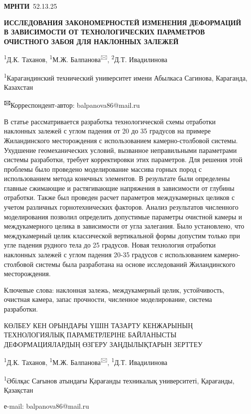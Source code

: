 \newpage
{\bfseries МРНТИ}~52.13.25

{\bfseries ИССЛЕДОВАНИЯ ЗАКОНОМЕРНОСТЕЙ ИЗМЕНЕНИЯ ДЕФОРМАЦИЙ В ЗАВИСИМОСТИ
ОТ ТЕХНОЛОГИЧЕСКИХ ПАРАМЕТРОВ ОЧИСТНОГО ЗАБОЯ ДЛЯ НАКЛОННЫХ ЗАЛЕЖЕЙ}

\textsuperscript{1}Д.К. Таханов, \textsuperscript{1}М.Ж.
Балпанова\textsuperscript{🖂}, \textsuperscript{2}Д.Т. Ивадилинова

\textsuperscript{1}Карагандинский технический университет имени Абылкаса
Сагинова, Караганда, Казахстан

{\bfseries \textsuperscript{🖂}}Корреспондент-автор: balpanova86@mail.ru

В статье рассматривается разработка технологической схемы отработки
наклонных залежей с углом падения от 20 до 35 градусов на примере
Жиландинского месторождения с использованием камерно-столбовой системы.
Ухудшение геомеханических условий, вызванное неправильными параметрами
системы разработки, требует корректировки этих параметров. Для решения
этой проблемы было проведено моделирование массива горных пород с
использованием метода конечных элементов. В результате были определены
главные сжимающие и растягивающие напряжения в зависимости от глубины
отработки. Также был проведен расчет параметров междукамерных целиков с
учетом различных горнотехнических факторов. Анализ результатов
численного моделирования позволил определить допустимые параметры
очистной камеры и междукамерного целика в зависимости от угла залегания.
Было установлено, что междукамерный целик классической вертикальной
формы допустим только при угле падения рудного тела до 25 градусов.
Новая технология отработки наклонных залежей с углом падения 20-35
градусов с использованием камерно-столбовой системы была разработана на
основе исследований Жиландинского месторождения.

Ключевые слова: наклонная залежь, междукамерный целик, устойчивость,
очистная камера, запас прочности, численное моделирование, система
разработки.

КӨЛБЕУ КЕН ОРЫНДАРЫ ҮШІН ТАЗАРТУ КЕНЖАРЫНЫҢ ТЕХНОЛОГИЯЛЫҚ ПАРАМЕТРЛЕРІНЕ
БАЙЛАНЫСТЫ ДЕФОРМАЦИЯЛАРДЫҢ ӨЗГЕРУ ЗАҢДЫЛЫҚТАРЫН ЗЕРТТЕУ

\textsuperscript{1}Д.К. Таханов, \textsuperscript{1}М.Ж.
Балпанова\textsuperscript{🖂}, \textsuperscript{1}Д.Т. Ивадилинова

\textsuperscript{1}Әбілқас Сағынов атындағы Қарағанды техникалық
университеті, Қарағанды, Қазақстан

е-mail: balpanova86@mail.ru

